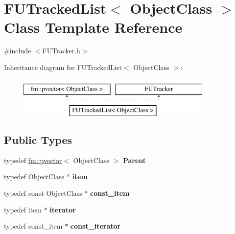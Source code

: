 \hypertarget{classFUTrackedList}{
\section{FUTrackedList$<$ ObjectClass $>$ Class Template Reference}
\label{classFUTrackedList}
}


{\ttfamily \#include $<$FUTracker.h$>$}

Inheritance diagram for FUTrackedList$<$ ObjectClass $>$:\begin{figure}[H]
\begin{center}
\leavevmode
\includegraphics[height=2.000000cm]{classFUTrackedList}
\end{center}
\end{figure}
\subsection*{Public Types}
\begin{DoxyCompactItemize}
\item 
\hypertarget{classFUTrackedList_a7262c3641e9917117d1bc09834c687b2}{
typedef \hyperlink{classfm_1_1pvector}{fm::pvector}$<$ ObjectClass $>$ {\bfseries Parent}}
\label{classFUTrackedList_a7262c3641e9917117d1bc09834c687b2}

\item 
\hypertarget{classFUTrackedList_a722e127f2a1da6027a62b76a4ecb6750}{
typedef ObjectClass $\ast$ {\bfseries item}}
\label{classFUTrackedList_a722e127f2a1da6027a62b76a4ecb6750}

\item 
\hypertarget{classFUTrackedList_a2614855fd26949c4351e8e7258910029}{
typedef const ObjectClass $\ast$ {\bfseries const\_\-item}}
\label{classFUTrackedList_a2614855fd26949c4351e8e7258910029}

\item 
\hypertarget{classFUTrackedList_a96196e0f8a3d0082eff17edd1cf519da}{
typedef item $\ast$ {\bfseries iterator}}
\label{classFUTrackedList_a96196e0f8a3d0082eff17edd1cf519da}

\item 
\hypertarget{classFUTrackedList_a71504f751d8ae5aff8ab2bb60b7f0005}{
typedef const\_\-item $\ast$ {\bfseries const\_\-iterator}}
\label{classFUTrackedList_a71504f751d8ae5aff8ab2bb60b7f0005}

\end{DoxyCompactItemize}
